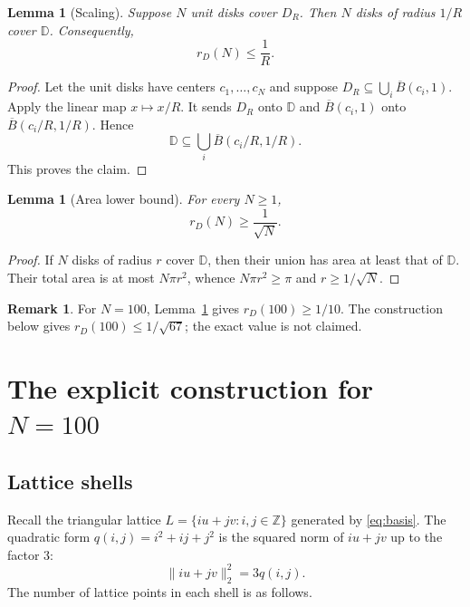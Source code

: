 \documentclass[11pt]{article}
\newtheorem{lemma}[theorem]{Lemma}
\theoremstyle{definition}
\newtheorem{remark}[theorem]{Remark}
\newcommand{\Z}{\mathbb{Z}}
\newcommand{\D}{\mathbb{D}}
\begin{document}
\begin{lemma}[Scaling]
\label{lem:scaling}
Suppose $N$ unit disks cover $D_R$.  Then $N$ disks of radius $1/R$
cover $\D$.  Consequently,
\begin{equation}
  r_D(N)\le \frac1R .
\end{equation}
\end{lemma}

\begin{proof}
Let the unit disks have centers $c_1,\dots,c_N$ and suppose
$D_R\subseteq\bigcup_i\overline B(c_i,1)$.  Apply the linear map
$x\mapsto x/R$.  It sends $D_R$ onto $\D$ and
$\overline B(c_i,1)$ onto
$\overline B(c_i/R,1/R)$.  Hence
\[
  \D\subseteq\bigcup_i\overline B(c_i/R,1/R).
\]
This proves the claim.
\end{proof}

\begin{lemma}[Area lower bound]
\label{lem:area}
For every $N\ge1$,
\begin{equation}
  r_D(N)\ge \frac1{\sqrt N}.
\end{equation}
\end{lemma}

\begin{proof}
If $N$ disks of radius $r$ cover $\D$, then their union has area at
least that of $\D$.  Their total area is at most $N\pi r^2$, whence
$N\pi r^2\ge\pi$ and $r\ge1/\sqrt N$.
\end{proof}

\begin{remark}
For $N=100$, Lemma~\ref{lem:area} gives $r_D(100)\ge1/10$.  The
construction below gives $r_D(100)\le1/\sqrt{67}$; the exact value is
not claimed.
\end{remark}

\section{The explicit construction for \texorpdfstring{$N=100$}{N=100}}
\label{sec:construction}

\subsection{Lattice shells}

Recall the triangular lattice $L=\{iu+jv:i,j\in\Z\}$ generated by
\eqref{eq:basis}.  The quadratic form $q(i,j)=i^2+ij+j^2$ is the
squared norm of $iu+jv$ up to the factor $3$:
\begin{equation}
  \|iu+jv\|_2^2=3q(i,j).
  \label{eq:normq}
\end{equation}
The number of lattice points in each shell is as follows.
\end{document}
